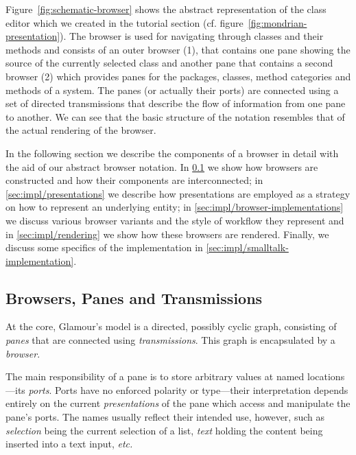 \documentclass[a4paper,10pt,twoside]{book}
\begin{document}
Figure~\ref{fig:schematic-browser} shows the abstract representation
of the class editor which we created in the tutorial section
(cf. figure~\ref{fig:mondrian-presentation}). The browser is used for
navigating through classes and their methods and consists of an outer
browser (1), that contains one pane showing the source of the
currently selected class and another pane that contains a second
browser (2) which provides panes for the packages, classes, method
categories and methods of a system. The panes (or actually their
ports) are connected using a set of directed transmissions that
describe the flow of information from one pane to another. We can see
that the basic structure of the notation resembles that of the actual
rendering of the browser.

In the following section we describe the components of a browser in
detail with the aid of our abstract browser notation. In
\ref{sec:impl/browsers-panes-transmissions} we show how browsers are
constructed and how their components are interconnected; in
\ref{sec:impl/presentations} we describe how presentations are
employed as a strategy on how to represent an underlying entity; in
\ref{sec:impl/browser-implementations} we discuss various browser
variants and the style of workflow they represent and in
\ref{sec:impl/rendering} we show how these browsers are
rendered. Finally, we discuss some specifics of the implementation in
\ref{sec:impl/smalltalk-implementation}.


\subsection{Browsers, Panes and Transmissions}
\label{sec:impl/browsers-panes-transmissions}

At the core, Glamour's model is a directed, possibly cyclic graph, consisting of \emph{panes} that are connected using \emph{transmissions}. This graph is encapsulated by a \emph{browser}.

The main responsibility of a pane is to store arbitrary values at named locations---its \emph{ports}. Ports have no enforced polarity or type---their interpretation depends entirely on the current \emph{presentations} of the pane which access and manipulate the pane's ports. The names usually reflect their intended use, however, such as \emph{selection} being the current selection of a list, \emph{text} holding the content being inserted into a text input, \emph{etc.} 
\end{document}
